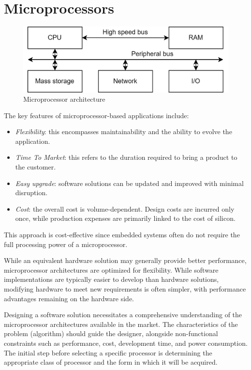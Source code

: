 \section{Microprocessors}

\begin{figure}[H]
    \centering
    \includegraphics[width=0.75\linewidth]{images/micpro.png}
    \caption{Microprocessor architecture}
\end{figure}
The key features of microprocessor-based applications include:
\begin{itemize}
    \item \textit{Flexibility}: this encompasses maintainability and the ability to evolve the application. 
    \item \textit{Time To Market}: this refers to the duration required to bring a product to the customer.
    \item \textit{Easy upgrade}: software solutions can be updated and improved with minimal disruption.
    \item \textit{Cost}: the overall cost is volume-dependent. 
        Design costs are incurred only once, while production expenses are primarily linked to the cost of silicon.
\end{itemize}
This approach is cost-effective since embedded systems often do not require the full processing power of a microprocessor.

While an equivalent hardware solution may generally provide better performance, microprocessor architectures are optimized for flexibility.  
While software implementations are typically easier to develop than hardware solutions, modifying hardware to meet new requirements is often simpler, with performance advantages remaining on the hardware side.

Designing a software solution necessitates a comprehensive understanding of the microprocessor architectures available in the market. 
The characteristics of the problem (algorithm) should guide the designer, alongside non-functional constraints such as performance, cost, development time, and power consumption. 
The initial step before selecting a specific processor is determining the appropriate class of processor and the form in which it will be acquired.

